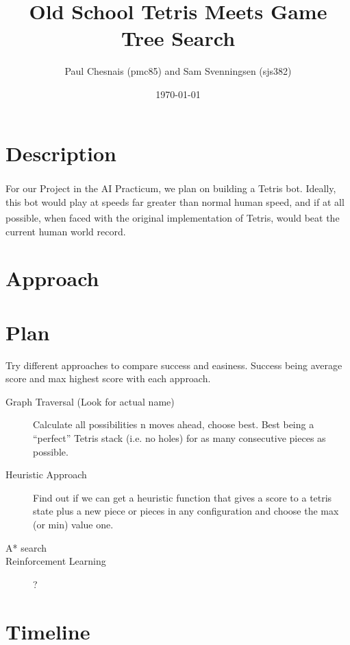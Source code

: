 \documentclass{article}
\title{Old School Tetris Meets Game Tree Search}
\author{Paul Chesnais (pmc85) and Sam Svenningsen (sjs382)}
\date{\today}
\def\tetris{Tetris\textsuperscript{\textregistered}}
\begin{document}
\maketitle
\thispagestyle{empty}

\section{Description}

\par For our Project in the AI Practicum, we plan on building a \tetris{} bot. Ideally, this bot would play at speeds far greater than normal human speed, and if at all possible, when faced with the original implementation of \tetris{}, would beat the current human world record.

\section{Approach}



\section{Plan}

Try different approaches to compare success and easiness. Success being average score and max highest score with each approach.

\begin{description}

  \item[Graph Traversal (Look for actual name)] Calculate all possibilities n moves ahead, choose best. Best being a ``perfect'' Tetris stack (i.e. no holes) for as many consecutive pieces as possible.

  \item[Heuristic Approach] Find out if we can get a heuristic function that gives a score to a tetris state plus a new piece or pieces in any configuration and choose the max (or min) value one.

  \item[A* search]

  \item[Reinforcement Learning]?

\end{description}


\section{Timeline}
\end{document}

